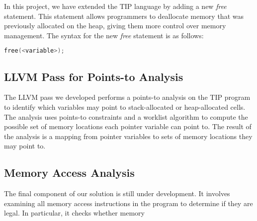 \documentclass[12pt,a4paper]{article}
\begin{document}
In this project, we have extended the TIP language by adding a new \textit{free} statement. This statement allows programmers to deallocate memory that was previously allocated on the heap, giving them more control over memory management. The syntax for the new \textit{free} statement is as follows:

\begin{lstlisting}[language=C, caption=Syntax for the new \textit{free} statement]
free(<variable>);
\end{lstlisting}

\subsection{LLVM Pass for Points-to Analysis}

The LLVM pass we developed performs a points-to analysis on the TIP program to identify which variables may point to stack-allocated or heap-allocated cells. The analysis uses points-to constraints and a worklist algorithm to compute the possible set of memory locations each pointer variable can point to. The result of the analysis is a mapping from pointer variables to sets of memory locations they may point to.

\subsection{Memory Access Analysis}

The final component of our solution is still under development. It involves examining all memory access instructions in the program to determine if they are legal. In particular, it checks whether memory
\end{document}
